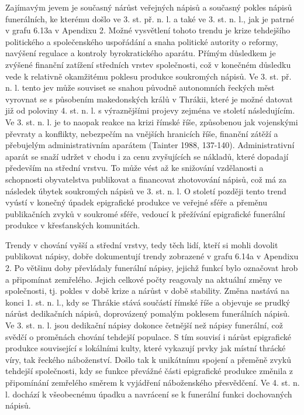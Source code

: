 Zajímavým jevem je současný nárůst veřejných nápisů a současný pokles nápisů funerálních, ke kterému došlo ve 3. st. př. n. l. a také ve 3. st. n. l., jak je patrné v grafu 6.13a v Apendixu 2. Možné vysvětlení tohoto trendu je krize tehdejšího politického a společenského uspořádání a snaha politické autority o reformy, navýšení regulace a kontroly byrokratického aparátu. Přímým důsledkem je zvýšené finanční zatížení středních vrstev společnosti, což v konečném důsledku vede k relativně okamžitému poklesu produkce soukromých nápisů. Ve 3. st. př. n. l. tento jev může souviset se snahou původně autonomních řeckých měst vyrovnat se s působením makedonských králů v Thrákii, které je možné datovat již od poloviny 4. st. n. l. s výraznějšími projevy zejména ve století následujícím. Ve 3. st. n. l. je to naopak reakce na krizi římské říše, způsobenou jak vojenskými převraty a konflikty, nebezpečím na vnějších hranicích říše, finanční zátěží a přebujelým administrativním aparátem (Tainter 1988, 137-140). Administrativní aparát se snaží udržet v chodu i za cenu zvyšujících se nákladů, které dopadají především na střední vrstvu. To může vést až ke snižování vzdělanosti a schopnosti obyvatelstva publikovat a financovat zhotovování nápisů, což má za následek úbytek soukromých nápisů ve 3. st. n. l. O století později tento trend vyústí v konečný úpadek epigrafické produkce ve veřejné sféře a přeměnu publikačních zvyků v soukromé sféře, vedoucí k přežívání epigrafické funerální produkce v křesťanských komunitách.

Trendy v chování vyšší a střední vrstvy, tedy těch lidí, kteří si mohli dovolit publikovat nápisy, dobře dokumentují trendy zobrazené v grafu 6.14a v Apendixu 2. Po většinu doby převládaly funerální nápisy, jejichž funkcí bylo označovat hrob a připomínat zemřelého. Jejich celkové počty reagovaly na aktuální změny ve společnosti, tj. pokles v době krize a nárůst v době stability. Změna nastává na konci 1. st. n. l., kdy se Thrákie stává součástí římské říše a objevuje se prudký nárůst dedikačních nápisů, doprovázený pomalým poklesem funerálních nápisů. Ve 3. st. n. l. jsou dedikační nápisy dokonce četnější než nápisy funerální, což svědčí o proměnách chování tehdejší populace. S tím souvisí i nárůst epigrafické produkce související s lokálními kulty, které vykazují prvky jak místní thrácké víry, tak řeckého náboženství. Došlo tak k unikátnímu spojení a přeměně zvyků tehdejší společnosti, kdy se funkce převážné části epigrafické produkce změnila z připomínání zemřelého směrem k vyjádření náboženského přesvědčení. Ve 4. st. n. l. dochází k všeobecnému úpadku a navrácení se k funerální funkci dochovaných nápisů.

